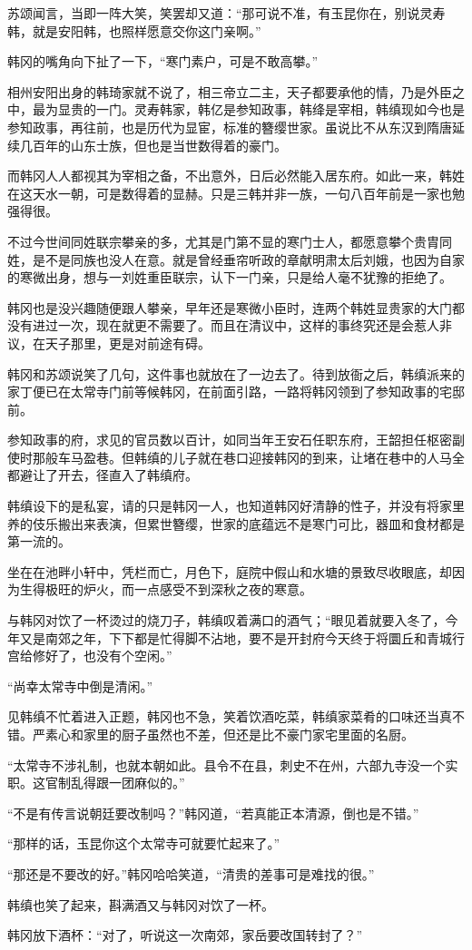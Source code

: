 苏颂闻言，当即一阵大笑，笑罢却又道：“那可说不准，有玉昆你在，别说灵寿韩，就是安阳韩，也照样愿意交你这门亲啊。”

韩冈的嘴角向下扯了一下，“寒门素户，可是不敢高攀。”

相州安阳出身的韩琦家就不说了，相三帝立二主，天子都要承他的情，乃是外臣之中，最为显贵的一门。灵寿韩家，韩亿是参知政事，韩绛是宰相，韩缜现如今也是参知政事，再往前，也是历代为显宦，标准的簪缨世家。虽说比不从东汉到隋唐延续几百年的山东士族，但也是当世数得着的豪门。

而韩冈人人都视其为宰相之备，不出意外，日后必然能入居东府。如此一来，韩姓在这天水一朝，可是数得着的显赫。只是三韩并非一族，一句八百年前是一家也勉强得很。

不过今世间同姓联宗攀亲的多，尤其是门第不显的寒门士人，都愿意攀个贵胄同姓，是不是同族也没人在意。就是曾经垂帘听政的章献明肃太后刘娥，也因为自家的寒微出身，想与一刘姓重臣联宗，认下一门亲，只是给人毫不犹豫的拒绝了。

韩冈也是没兴趣随便跟人攀亲，早年还是寒微小臣时，连两个韩姓显贵家的大门都没有进过一次，现在就更不需要了。而且在清议中，这样的事终究还是会惹人非议，在天子那里，更是对前途有碍。

韩冈和苏颂说笑了几句，这件事也就放在了一边去了。待到放衙之后，韩缜派来的家丁便已在太常寺门前等候韩冈，在前面引路，一路将韩冈领到了参知政事的宅邸前。

参知政事的府，求见的官员数以百计，如同当年王安石任职东府，王韶担任枢密副使时那般车马盈巷。但韩缜的儿子就在巷口迎接韩冈的到来，让堵在巷中的人马全都避让了开去，径直入了韩缜府。

韩缜设下的是私宴，请的只是韩冈一人，也知道韩冈好清静的性子，并没有将家里养的伎乐搬出来表演，但累世簪缨，世家的底蕴远不是寒门可比，器皿和食材都是第一流的。

坐在在池畔小轩中，凭栏而亡，月色下，庭院中假山和水塘的景致尽收眼底，却因为生得极旺的炉火，而一点感受不到深秋之夜的寒意。

与韩冈对饮了一杯烫过的烧刀子，韩缜叹着满口的酒气；“眼见着就要入冬了，今年又是南郊之年，下下都是忙得脚不沾地，要不是开封府今天终于将圜丘和青城行宫给修好了，也没有个空闲。”


“尚幸太常寺中倒是清闲。”

见韩缜不忙着进入正题，韩冈也不急，笑着饮酒吃菜，韩缜家菜肴的口味还当真不错。严素心和家里的厨子虽然也不差，但还是比不豪门家宅里面的名厨。

“太常寺不涉礼制，也就本朝如此。县令不在县，刺史不在州，六部九寺没一个实职。这官制乱得跟一团麻似的。”

“不是有传言说朝廷要改制吗？”韩冈道，“若真能正本清源，倒也是不错。”

“那样的话，玉昆你这个太常寺可就要忙起来了。”

“那还是不要改的好。”韩冈哈哈笑道，“清贵的差事可是难找的很。”

韩缜也笑了起来，斟满酒又与韩冈对饮了一杯。

韩冈放下酒杯：“对了，听说这一次南郊，家岳要改国转封了？”

